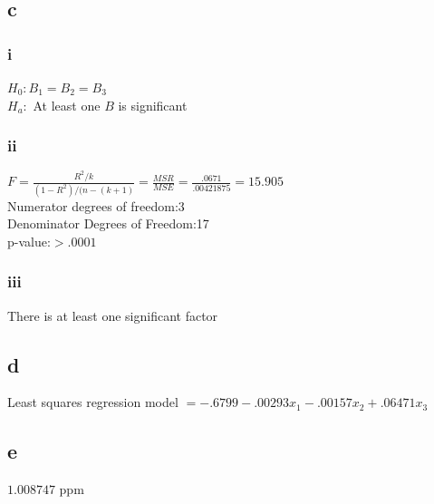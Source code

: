 \documentclass[10pt,letterpaper]{article}
\begin{document}
\subsection*{c}
\subsubsection*{i}
$H_0:B_1=B_2=B_3$\\
$H_a:$ At least one $B$ is significant
\subsubsection*{ii}
$F=\frac{R^2/k}{(1-R^2)/(n-(k+1)}=\frac{MSR}{MSE}=\frac{.0671}{.00421875}=15.905$\\
Numerator degrees of freedom:3 \\
Denominator Degrees of Freedom:17 \\
p-value:$>.0001$ \\

\subsubsection*{iii}
There is at least one significant factor

\subsection*{d}
Least squares regression model $ = -.6799 - .00293x_1 - .00157x_2 + .06471x_3$

\subsection*{e}
$1.008747$ ppm 
\end{document}
